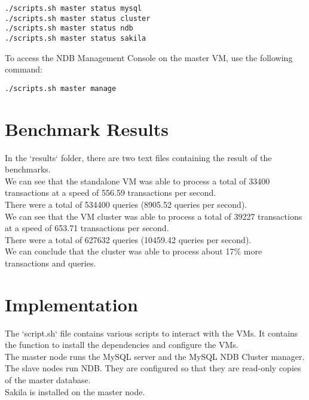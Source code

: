 \documentclass[11pt]{article}
\begin{document}
    \begin{verbatim}
./scripts.sh master status mysql
./scripts.sh master status cluster
./scripts.sh master status ndb
./scripts.sh master status sakila
    \end{verbatim}

    To access the NDB Management Console on the master VM, use the following command:

    \begin{verbatim}
./scripts.sh master manage
    \end{verbatim}


    \section{Benchmark Results}
    In the `results` folder, there are two text files containing the result of the benchmarks. \\

    We can see that the standalone VM was able to process a total of 33400 transactions at a speed of 556.59 transactions per second. \\
    There were a total of 534400 queries (8905.52 queries per second). \\

    We can see that the VM cluster was able to process a total of 39227 transactions at a speed of 653.71 transactions per second. \\
    There were a total of 627632 queries (10459.42 queries per second). \\

    We can conclude that the cluster was able to process about 17\% more transactions and queries. \\


    \section{Implementation}

    The `script.sh` file contains various scripts to interact with the VMs.
    It contains the function to install the dependencies and configure the VMs. \\

    The master node runs the MySQL server and the MySQL NDB Cluster manager. \\
    The slave nodes run NDB\@.
    They are configured so that they are read-only copies of the master database. \\
    Sakila is installed on the master node. \\
\end{document}
